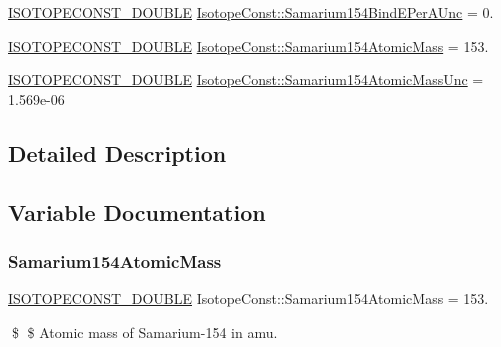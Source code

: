 \begin{DoxyCompactItemize}
\mbox{\hyperlink{group___isotope_const-_macros_ga8f45a7272ce02c0b4c65c44636ed719a}{I\+S\+O\+T\+O\+P\+E\+C\+O\+N\+S\+T\+\_\+\+D\+O\+U\+B\+LE}} \mbox{\hyperlink{group___isotope_const-_samarium-_sm154_gaaf5e7fb1df10e3979dc7c48747562cdd}{Isotope\+Const\+::\+Samarium154\+Bind\+E\+Per\+A\+Unc}} = 0.
\item 
\mbox{\hyperlink{group___isotope_const-_macros_ga8f45a7272ce02c0b4c65c44636ed719a}{I\+S\+O\+T\+O\+P\+E\+C\+O\+N\+S\+T\+\_\+\+D\+O\+U\+B\+LE}} \mbox{\hyperlink{group___isotope_const-_samarium-_sm154_ga3273c06254182c5ef4e2d96fa4d62fda}{Isotope\+Const\+::\+Samarium154\+Atomic\+Mass}} = 153.
\item 
\mbox{\hyperlink{group___isotope_const-_macros_ga8f45a7272ce02c0b4c65c44636ed719a}{I\+S\+O\+T\+O\+P\+E\+C\+O\+N\+S\+T\+\_\+\+D\+O\+U\+B\+LE}} \mbox{\hyperlink{group___isotope_const-_samarium-_sm154_gabc09957fa0e103d6833a6bb28f0d6642}{Isotope\+Const\+::\+Samarium154\+Atomic\+Mass\+Unc}} = 1.\+569e-\/06
\end{DoxyCompactItemize}


\subsection{Detailed Description}


\subsection{Variable Documentation}
\mbox{\label{group___isotope_const-_samarium-_sm154_ga3273c06254182c5ef4e2d96fa4d62fda}} 
\subsubsection{\texorpdfstring{Samarium154\+Atomic\+Mass}{Samarium154AtomicMass}}
{\footnotesize\ttfamily \mbox{\hyperlink{group___isotope_const-_macros_ga8f45a7272ce02c0b4c65c44636ed719a}{I\+S\+O\+T\+O\+P\+E\+C\+O\+N\+S\+T\+\_\+\+D\+O\+U\+B\+LE}} Isotope\+Const\+::\+Samarium154\+Atomic\+Mass = 153.}

\$ \$ Atomic mass of Samarium-\/154 in amu. \mbox{\label{group___isotope_const-_samarium-_sm154_gabc09957fa0e103d6833a6bb28f0d6642}} 
